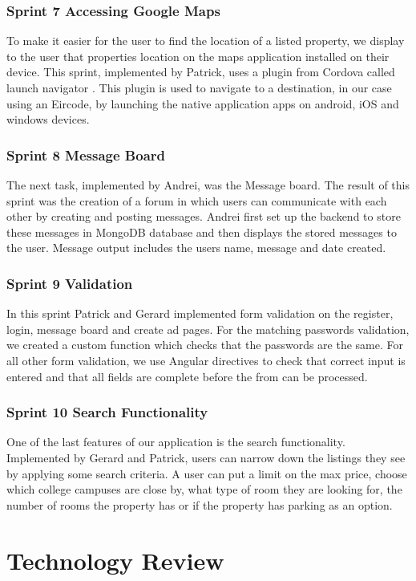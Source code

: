\subsection{Sprint 7 Accessing Google Maps}
To make it easier for the user to find the location of a listed property, we display to the user that properties location on the maps application installed on their device. This sprint, implemented by Patrick, uses a plugin from Cordova called launch navigator \cite{LaunchNav}. This plugin is used to navigate to a destination, in our case using an Eircode, by launching the native application apps on android, iOS and windows devices.

\subsection{Sprint 8 Message Board }
The next task, implemented by Andrei, was the Message board. The result of this sprint was the creation of a forum in which users can communicate with each other by creating and posting messages. Andrei first set up the backend to store these messages in MongoDB database and then displays the stored messages to the user. Message output includes the users name, message and date created.

\subsection{Sprint 9 Validation}
In this sprint Patrick and Gerard implemented form validation on the register, login, message board and create ad pages. For the matching passwords validation, we created a custom function which checks that the passwords are the same. For all other form validation, we use Angular directives to check that correct input is entered and that all fields are complete before the from can be processed. 

\subsection{Sprint 10 Search Functionality}
One of the last features of our application is the search functionality. Implemented by Gerard and Patrick, users can narrow down the listings they see by applying some search criteria. A user can put a limit on the max price, choose which college campuses are close by, what type of room they are looking for, the number of rooms the property has or if the property has parking as an option.


\chapter{Technology Review}

